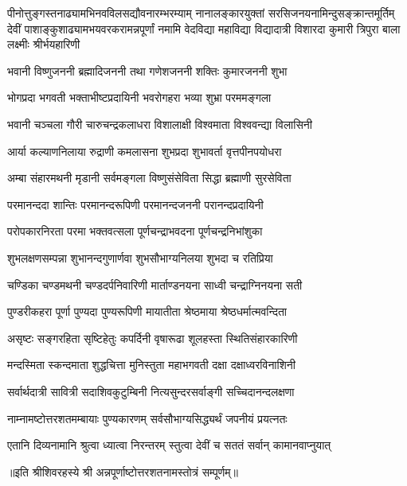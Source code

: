 
{पीनोत्तुङ्गस्तनाढ्यामभिनवविलसद्यौवनारम्भरम्याम्}
{नानालङ्कारयुक्तां सरसिजनयनामिन्दुसङ्क्रान्तमूर्तिम्}
{देवीं पाशाङ्कुशाढ्यामभयवरकरामन्नपूर्णां नमामि}
\twolineshloka
{वेदविद्या महाविद्या विद्यादात्री विशारदा}
{कुमारी त्रिपुरा बाला लक्ष्मीः श्रीर्भयहारिणी}

\twolineshloka
{भवानी विष्णुजननी ब्रह्मादिजननी तथा}
{गणेशजननी शक्तिः कुमारजननी शुभा}

\twolineshloka
{भोगप्रदा भगवती भक्ताभीष्टप्रदायिनी}
{भवरोगहरा भव्या शुभ्रा परममङ्गला}

\twolineshloka
{भवानी चञ्चला गौरी चारुचन्द्रकलाधरा}
{विशालाक्षी विश्वमाता विश्ववन्द्या विलासिनी}

\twolineshloka
{आर्या कल्याणनिलाया रुद्राणी कमलासना}
{शुभप्रदा शुभावर्ता वृत्तपीनपयोधरा}

\twolineshloka
{अम्बा संहारमथनी मृडानी सर्वमङ्गला}
{विष्णुसंसेविता सिद्धा ब्रह्माणी सुरसेविता}

\twolineshloka
{परमानन्ददा शान्तिः परमानन्दरूपिणी}
{परमानन्दजननी परानन्दप्रदायिनी}

\twolineshloka
{परोपकारनिरता परमा भक्तवत्सला}
{पूर्णचन्द्राभवदना पूर्णचन्द्रनिभांशुका}

\twolineshloka
{शुभलक्षणसम्पन्ना शुभानन्दगुणार्णवा}
{शुभसौभाग्यनिलया शुभदा च रतिप्रिया}

\twolineshloka
{चण्डिका चण्डमथनी चण्डदर्पनिवारिणी}
{मार्ताण्डनयना साध्वी चन्द्राग्निनयना सती}

\twolineshloka
{पुण्डरीकहरा पूर्णा पुण्यदा पुण्यरूपिणी}
{मायातीता श्रेष्ठमाया श्रेष्ठधर्मात्मवन्दिता}

\twolineshloka
{असृष्टः सङ्गरहिता सृष्टिहेतुः कपर्दिनी}
{वृषारूढा शूलहस्ता स्थितिसंहारकारिणी}

\twolineshloka
{मन्दस्मिता स्कन्दमाता शुद्धचित्ता मुनिस्तुता}
{महाभगवती दक्षा दक्षाध्वरविनाशिनी}

\twolineshloka
{सर्वार्थदात्री सावित्री सदाशिवकुटुम्बिनी}
{नित्यसुन्दरसर्वाङ्गी सच्चिदानन्दलक्षणा}

\twolineshloka
{नाम्नामष्टोत्तरशतमम्बायाः पुण्यकारणम्}
{सर्वसौभाग्यसिद्ध्यर्थं जपनीयं प्रयत्नतः}

\twolineshloka
{एतानि दिव्यनामानि श्रुत्वा ध्यात्वा निरन्तरम्}
{स्तुत्वा देवीं च सततं सर्वान् कामानवाप्नुयात्}

{॥इति श्रीशिवरहस्ये श्री अन्नपूर्णाष्टोत्तरशतनामस्तोत्रं सम्पूर्णम्॥}
